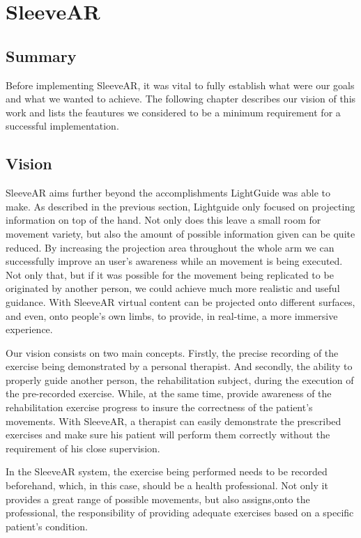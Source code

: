 \chapter{SleeveAR}
\label{sec:sleevear}

\section*{Summary}

Before implementing SleeveAR, it was vital to fully establish what were our goals and what we wanted to achieve. 
The following chapter describes our vision of this work and lists the feautures we considered to be a minimum requirement for a successful implementation.



\section{Vision}

SleeveAR aims further beyond the accomplishments LightGuide was able to make. 
As described in the previous section, Lightguide only focused on projecting information on top of the hand. Not only does this leave a small room for movement variety, but also the amount of possible information given can be quite reduced.
By increasing the projection area throughout the whole arm we can successfully improve an user's awareness while an movement is being executed. 
Not only that, but if it was possible for the movement being replicated to be originated by another person, we could achieve much more realistic and useful guidance.
With SleeveAR virtual content can be projected onto different surfaces, and even, onto people's own limbs, to provide, in real-time, a more immersive experience. 

Our vision consists on two main concepts. Firstly, the precise recording of the exercise being demonstrated by a personal therapist. 
And secondly, the ability to properly guide another person, the rehabilitation subject, during the execution of the pre-recorded exercise. 
While, at the same time, provide awareness of the rehabilitation exercise progress to insure the correctness of the patient's movements.
With SleeveAR, a therapist can easily demonstrate the prescribed exercises and make sure his patient will perform them correctly without the requirement of his close supervision.

In the SleeveAR system, the exercise being performed needs to be recorded beforehand, which, in this case, should be a health professional. 
Not only it provides a great range of possible movements, but also assigns,onto the professional, the responsibility of providing adequate exercises based on a specific patient's condition.

